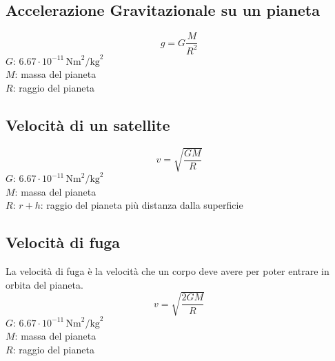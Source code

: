 \subsection{Accelerazione Gravitazionale su un pianeta}
\begin{equation*}
g = G\frac{M}{R^2}
\end{equation*}
\hyperref[tab:g]{$G$}: $6.67\cdot10^{-11}\,\text{Nm}^2\text{/kg}^2$\\
$M$: massa del pianeta\\
$R$: raggio del pianeta

\subsection{Velocità di un satellite}
\begin{equation*}
v = \sqrt{\frac{GM}{R}}
\end{equation*}
\hyperref[tab:g]{$G$}: $6.67\cdot10^{-11}\,\text{Nm}^2\text{/kg}^2$\\
$M$: massa del pianeta\\
$R$: $r + h$: raggio del pianeta più distanza dalla superficie

\subsection{Velocità di fuga}
La velocità di fuga è la velocità che un corpo deve avere per poter entrare in orbita del pianeta.
\begin{equation*}
v = \sqrt{\frac{2GM}{R}}
\end{equation*}
\hyperref[tab:g]{$G$}: $6.67\cdot10^{-11}\,\text{Nm}^2\text{/kg}^2$\\
$M$: massa del pianeta\\
$R$: raggio del pianeta\\
